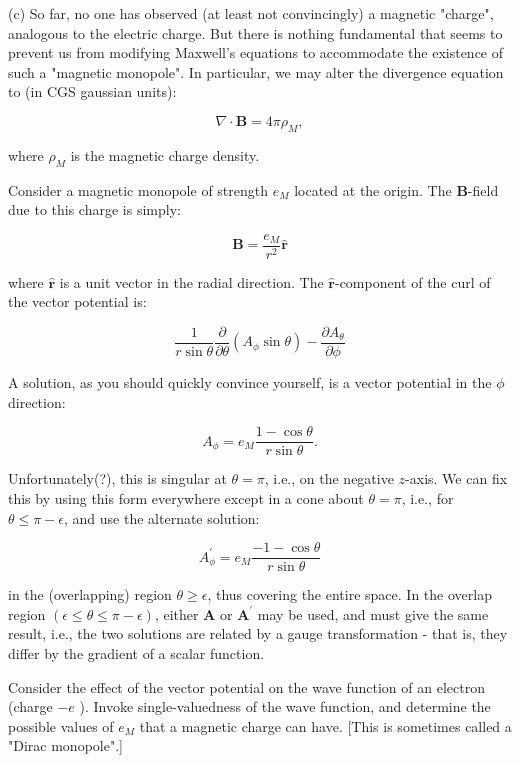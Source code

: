 \documentclass[12pt]{article}
\begin{document}
(c) So far, no one has observed (at least not convincingly) a magnetic "charge", analogous to the electric charge. But there is nothing fundamental that seems to prevent us from modifying Maxwell's equations to accommodate the existence of such a "magnetic monopole". In particular, we may alter the divergence equation to (in CGS gaussian units):

$$
\nabla \cdot \boldsymbol{B}=4 \pi \rho_{M},
$$

where $\rho_{M}$ is the magnetic charge density.

Consider a magnetic monopole of strength $e_{M}$ located at the origin. The $\boldsymbol{B}$-field due to this charge is simply:

$$
\boldsymbol{B}=\frac{e_{M}}{r^{2}} \hat{\boldsymbol{r}}
$$

where $\hat{\boldsymbol{r}}$ is a unit vector in the radial direction. The $\hat{\boldsymbol{r}}$-component of the curl of the vector potential is:

$$
\frac{1}{r \sin \theta} \frac{\partial}{\partial \theta}\left(A_{\phi} \sin \theta\right)-\frac{\partial A_{\theta}}{\partial \phi}
$$

A solution, as you should quickly convince yourself, is a vector potential in the $\phi$ direction:

$$
A_{\phi}=e_{M} \frac{1-\cos \theta}{r \sin \theta} .
$$

Unfortunately(?), this is singular at $\theta=\pi$, i.e., on the negative $z$-axis. We can fix this by using this form everywhere except in a cone about $\theta=\pi$, i.e., for $\theta \leq \pi-\epsilon$, and use the alternate solution:

$$
A_{\phi}^{\prime}=e_{M} \frac{-1-\cos \theta}{r \sin \theta}
$$

in the (overlapping) region $\theta \geq \epsilon$, thus covering the entire space. In the overlap region $(\epsilon \leq \theta \leq \pi-\epsilon)$, either $\boldsymbol{A}$ or $\boldsymbol{A}^{\prime}$ may be used, and must give the same result, i.e., the two solutions are related by a gauge transformation - that is, they differ by the gradient of a scalar function.

Consider the effect of the vector potential on the wave function of an electron (charge $-e$ ). Invoke single-valuedness of the wave function, and determine the possible values of $e_{M}$ that a magnetic charge can have. [This is sometimes called a "Dirac monopole".]
\end{document}
